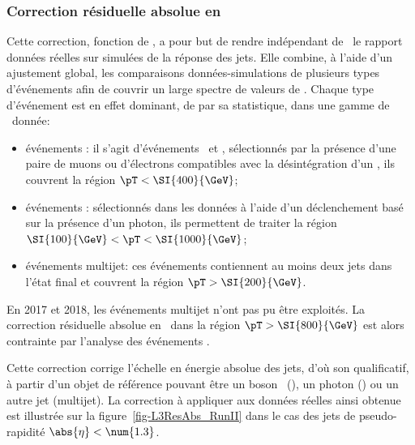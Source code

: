 \subsubsection{Correction résiduelle absolue en \pT}\label{chapter-JERC-section-CMS-subsec-residuals_pT}
Cette correction, fonction de \pT, a pour but de rendre indépendant de \pT\ le rapport données réelles sur simulées de la réponse des jets.
Elle combine, à l'aide d'un ajustement global, les comparaisons données-simulations de plusieurs types d'événements afin de couvrir un large spectre de valeurs de \pT. Chaque type d'événement est en effet dominant, de par sa statistique, dans une gamme de \pT\ donnée:
\begin{itemize}
\item événements \Zjets: il s'agit d'événements \Zmmjets\ et \Zeejets, sélectionnés par la présence d'une paire de muons ou d'électrons compatibles avec la désintégration d'un \Zboson, ils couvrent la région $\pT<\SI{400}{\GeV}$;
\item événements \Gjets: sélectionnés dans les données à l'aide d'un déclenchement basé sur la présence d'un photon, ils permettent de traiter la région $\SI{100}{\GeV}<\pT<\SI{1000}{\GeV}$;
\item événements multijet: ces événements contiennent au moins deux jets dans l'état final et couvrent la région $\pT>\SI{200}{\GeV}$.
\end{itemize}
En 2017 et 2018, les événements multijet n'ont pas pu être exploités.
La correction résiduelle absolue en \pT\ dans la région $\pT>\SI{800}{\GeV}$ est alors contrainte par l'analyse des événements \Gjets.
\par Cette correction corrige l'échelle en énergie absolue des jets, d'où son qualificatif, à partir d'un objet de référence pouvant être un boson \Zboson\ (\Zjets), un photon (\Gjets) ou un autre jet (multijet).
La correction à appliquer aux données réelles ainsi obtenue est illustrée sur la figure~\ref{fig-L3ResAbs_RunII} dans le cas des jets de pseudo-rapidité $\abs{\eta}<\num{1.3}$.
